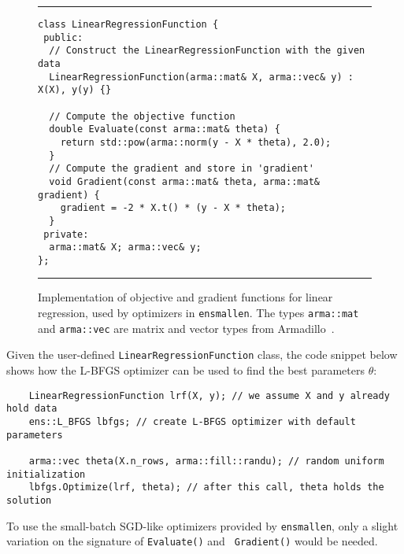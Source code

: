 \documentclass{article}
\begin{document}
\begin{figure}[!tb]
\hrule\vspace*{0.5ex}
\begin{adjustbox}{scale={0.95}{0.90}}
\begin{minipage}{\textwidth}
\begin{verbatim}
class LinearRegressionFunction {
 public:
  // Construct the LinearRegressionFunction with the given data
  LinearRegressionFunction(arma::mat& X, arma::vec& y) : X(X), y(y) {}

  // Compute the objective function
  double Evaluate(const arma::mat& theta) {
    return std::pow(arma::norm(y - X * theta), 2.0);
  }
  // Compute the gradient and store in 'gradient'
  void Gradient(const arma::mat& theta, arma::mat& gradient) {
    gradient = -2 * X.t() * (y - X * theta);
  }
 private:
  arma::mat& X; arma::vec& y;
};
\end{verbatim}
\end{minipage}
\end{adjustbox}
\vspace*{0.5ex}\hrule\vspace*{0.5ex}
\caption
  {
  Implementation of objective and gradient functions for linear regression,
  used by optimizers in \texttt{ensmallen}.
  The types {\footnotesize\tt arma::mat} and {\footnotesize\tt arma::vec}
  are matrix and vector types
  from Armadillo~\cite{sanderson2016armadillo}.
  }
\label{fig:LinearRegressionFunction}
\end{figure}

Given the user-defined {\tt LinearRegressionFunction} class,
the code snippet below
shows how the L-BFGS optimizer can be used to find the best parameters $\theta$:

\vspace*{-0.4em}
\begin{verbatim}
    LinearRegressionFunction lrf(X, y); // we assume X and y already hold data
    ens::L_BFGS lbfgs; // create L-BFGS optimizer with default parameters

    arma::vec theta(X.n_rows, arma::fill::randu); // random uniform initialization
    lbfgs.Optimize(lrf, theta); // after this call, theta holds the solution
\end{verbatim}
\vspace*{-0.4em}

To use the small-batch SGD-like optimizers provided by {\tt ensmallen},
only a slight variation on the signature of {\tt Evaluate()} and {\tt
Gradient()} would be needed.
\end{document}
